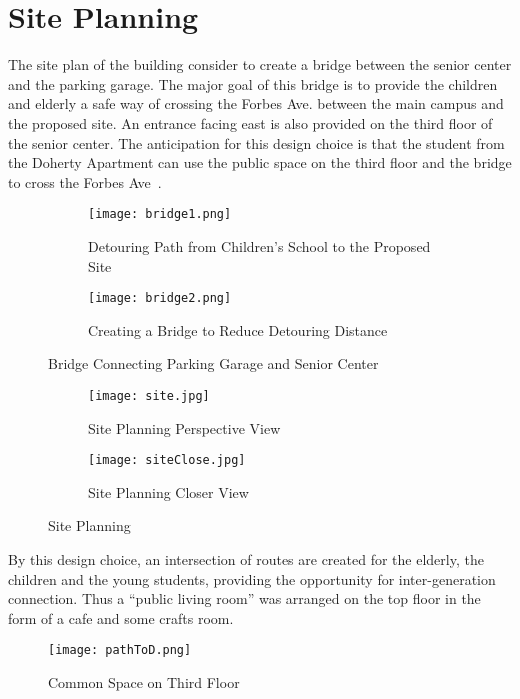 \section{Site Planning}
The site plan of the building consider to create a bridge between the
senior center and the parking garage. The major goal of this bridge is
to provide the children and elderly a safe way of crossing the Forbes
Ave. between the main campus and the proposed site. An entrance facing
east is also provided on the third floor of the senior center. The
anticipation for this design choice is that the student from the
Doherty Apartment can use the public space on the third floor and the
bridge to cross the Forbes Ave~.~
\begin{figure}[h!]
\centering
\begin{subfigure}{0.6\textwidth}
  \centering
  \texttt{[image: bridge1.png]}
  \caption{Detouring Path from Children's School to the Proposed Site}
  \label{fig:bridge1}
\end{subfigure}
\begin{subfigure}{0.6\textwidth}
  \centering
  \texttt{[image: bridge2.png]}
  \caption{Creating a Bridge to Reduce Detouring Distance}
  \label{fig:bridge2}
\end{subfigure}
\caption{Bridge Connecting Parking Garage and Senior Center}
\label{fig:bridge}
\end{figure}

\clearpage
\begin{figure}
\centering
\begin{subfigure}{\textwidth}
  \centering
  \texttt{[image: site.jpg]}
  \caption[Site Planning]{Site Planning Perspective View}
  \label{fig:site}
\end{subfigure}
\begin{subfigure}{\textwidth}
  \centering
  \texttt{[image: siteClose.jpg]}
  \caption[Site Planning Closer View]{Site Planning Closer View}
  \label{fig:siteClose}
\end{subfigure}
\caption{Site Planning}
\label{fig:siteAll}
\end{figure}

\clearpage
By this design choice, an intersection of routes are created for the
elderly, the children and the young students, providing the
opportunity for inter-generation connection. Thus a ``public living
room'' was arranged on the top floor in the form of a cafe and some
crafts room. ~
\begin{figure}[h!]
  \centering
  \texttt{[image: pathToD.png]}
  \caption[Common Space on Third Floor Entrance]{Common Space on Third
    Floor}
  \label{fig:pathToD}
\end{figure}

